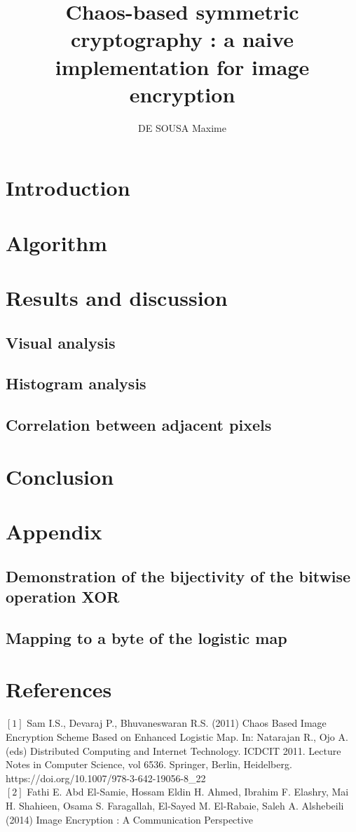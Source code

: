 \documentclass[eng]{tex/class/phynum-class}
\title{Chaos-based symmetric cryptography : a naive implementation for image encryption}
\author[1]{DE SOUSA Maxime}
\affil[1]{Université Grenoble-Alpes, Physique parcours recherche fondamentale, Grenoble, France}
\begin{document}
\maketitle
\thispagestyle{fancy}

\section{Introduction}
	
\section{Algorithm}
	
\section{Results and discussion}
	
\subsection{Visual analysis}
	
\subsection{Histogram analysis}
	
\subsection{Correlation between adjacent pixels}
	
\section{Conclusion}
	
\section{Appendix}
\subsection{Demonstration of the bijectivity of the bitwise operation XOR}
	
\subsection{Mapping to a byte of the logistic map}
	
\section*{References}
	$[1]$ Sam I.S., Devaraj P., Bhuvaneswaran R.S. (2011) Chaos Based Image Encryption Scheme Based on Enhanced Logistic Map. In: Natarajan R., Ojo A. (eds) Distributed Computing and Internet Technology. ICDCIT 2011. Lecture Notes in Computer Science, vol 6536. Springer, Berlin, Heidelberg. https://doi.org/10.1007/978-3-642-19056-8\_22 \\

	$[2]$ Fathi E. Abd El-Samie, Hossam Eldin H. Ahmed, Ibrahim F. Elashry, Mai H. Shahieen, Osama S. Faragallah, El-Sayed M. El-Rabaie, Saleh A. Alshebeili (2014) Image Encryption : A Communication Perspective
\end{document}
